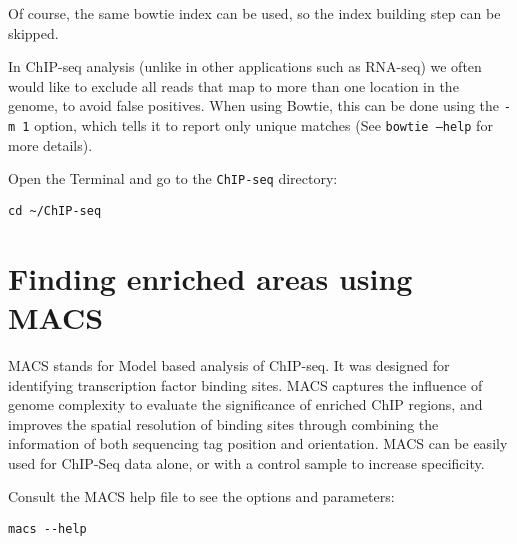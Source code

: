 \begin{information}
Of course, the same bowtie index can be used, so the index building step can be
skipped.
\end{information}

\begin{note}
In ChIP-seq analysis (unlike in other applications such as RNA-seq) we often
would like to exclude all reads that map to more than one location in the
genome, to avoid false positives. When using Bowtie, this can be done using the
\texttt{-m 1} option, which tells it to report only unique matches (See
\texttt{bowtie --help} for more details).
\end{note}


\begin{steps}
Open the Terminal and go to the \texttt{ChIP-seq} directory:
\begin{lstlisting}
cd ~/ChIP-seq
\end{lstlisting}
\end{steps}

\section{Finding enriched areas using MACS}

\begin{information}
MACS stands for Model based analysis of ChIP-seq. It was designed for
identifying transcription factor binding sites. MACS captures the influence of
genome complexity to evaluate the significance of enriched ChIP regions, and
improves the spatial resolution of binding sites through combining the
information of both sequencing tag position and orientation. MACS can be easily
used for ChIP-Seq data alone, or with a control sample to increase specificity.
\end{information}

\begin{steps}
Consult the MACS help file to see the options and parameters:

\begin{lstlisting}
macs --help
\end{lstlisting}
\end{steps}

